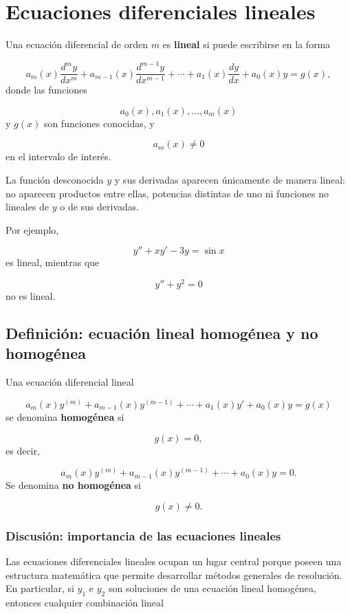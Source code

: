 \documentclass[12pt,a4paper]{article}
\begin{document}
	\clearpage
	\section{Ecuaciones diferenciales lineales}
	
	Una ecuación diferencial de orden \(m\) es \textbf{lineal} si puede escribirse en la forma
	
	\[
	a_m(x)\frac{d^m y}{dx^m}
	+
	a_{m-1}(x)\frac{d^{m-1}y}{dx^{m-1}}
	+
	\cdots
	+
	a_1(x)\frac{dy}{dx}
	+
	a_0(x)y
	=
	g(x),
	\]
	donde las funciones
	
	\[
	a_0(x),a_1(x),\dots,a_m(x)
	\]
	y \(g(x)\) son funciones conocidas, y
	
	\[
	a_m(x)\neq 0
	\]
	en el intervalo de interés.
	
	La función desconocida \(y\) y sus derivadas aparecen únicamente de manera lineal: no aparecen productos entre ellas, potencias distintas de uno ni funciones no lineales de \(y\) o de sus derivadas.
	
	Por ejemplo,
	
	\[
	y''+x y'-3y=\sin x
	\]
	es lineal, mientras que
	
	\[
	y''+y^2=0
	\]
	no es lineal.
	
	\subsection{Definición: ecuación lineal homogénea y no homogénea}
	
	Una ecuación diferencial lineal
	
	\[
	a_m(x)y^{(m)}
	+
	a_{m-1}(x)y^{(m-1)}
	+
	\cdots
	+
	a_1(x)y'
	+
	a_0(x)y
	=
	g(x)
	\]
	se denomina \textbf{homogénea} si
	
	\[
	g(x)=0,
	\]
	es decir,
	
	\[
	a_m(x)y^{(m)}
	+
	a_{m-1}(x)y^{(m-1)}
	+
	\cdots
	+
	a_0(x)y
	=
	0.
	\]
	Se denomina \textbf{no homogénea} si
	
	\[
	g(x)\neq 0.
	\]
	\subsubsection*{Discusión: importancia de las ecuaciones lineales}
	
	Las ecuaciones diferenciales lineales ocupan un lugar central porque poseen una estructura matemática que permite desarrollar métodos generales de resolución. En particular, si \(y_1\) e \(y_2\) son soluciones de una ecuación lineal homogénea, entonces cualquier combinación lineal
	
\end{document}
